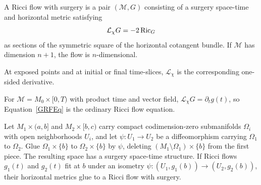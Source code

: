 \begin{definition}
\label{def:ricci-flow-with-surgery}

A Ricci flow with surgery is a pair $({\mathcal M},G)$ consisting of a surgery
space-time and horizontal metric satisfying
\begin{equation}
\label{GRFEq}
  {\mathcal L}_\chi G=-2\operatorname{Ric}_G
\end{equation}
as sections of the symmetric square of the horizontal cotangent bundle. If
${\mathcal M}$ has dimension $n+1$, the flow is $n$-dimensional.
\end{definition}

\begin{remark}
\label{rem:one-sided-lie-derivative}

At exposed points and at initial or final time-slices,
${\mathcal L}_\chi$ is the corresponding one-sided derivative.
\end{remark}

\begin{example}
\label{ex:ordinary-flow-as-surgery-flow}

For ${\mathcal M}=M_0\times[0,T)$ with product time and vector field,
${\mathcal L}_\chi G=\partial_tg(t)$, so Equation~\eqref{GRFEq} is the
ordinary Ricci flow equation.
\end{example}

\begin{lemma}
\label{lem:gluing-ricci-flows-with-surgery}

\label{gluingsoln}
Let $M_1\times(a,b]$ and $M_2\times[b,c)$ carry compact codimension-zero
submanifolds $\Omega_i$ with open neighborhoods $U_i$, and let
$\psi:U_1\to U_2$ be a diffeomorphism carrying $\Omega_1$ to $\Omega_2$.
Glue $\Omega_1\times\{b\}$ to $\Omega_2\times\{b\}$ by $\psi$, deleting
$(M_1\setminus\Omega_1)\times\{b\}$ from the first piece. The resulting
space has a surgery space-time structure. If Ricci flows $g_1(t)$ and $g_2(t)$
fit at $b$ under an isometry
$\psi:(U_1,g_1(b))\to(U_2,g_2(b))$, their horizontal metrics glue to a Ricci
flow with surgery.
\end{lemma}

